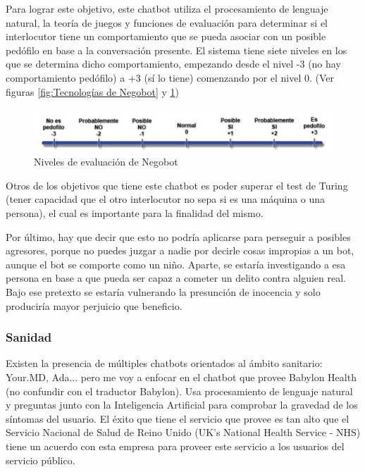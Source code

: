 \documentclass[spanish,12pt, a4paper, twoside]{paper}
\begin{document}
Para lograr este objetivo, este chatbot utiliza el procesamiento de lenguaje natural, la teoría de juegos y funciones de evaluación para determinar si el interlocutor tiene un comportamiento que se pueda asociar con un posible pedófilo en base a la conversación presente. El sistema tiene siete niveles en los que se determina dicho comportamiento, empezando desde el nivel -3 (no hay comportamiento pedófilo) a +3 (sí lo tiene) comenzando por el nivel 0. (Ver figuras \ref{fig:Tecnologías de Negobot} y \ref{fig:Niveles de evaluación de Negobot})
\newline

\begin{figure}
\centering
	\includegraphics[width=\textwidth]{recursos/Negobot_puntuaciones}
\caption{Niveles de evaluación de Negobot}
\label{fig:Niveles de evaluación de Negobot}
\end{figure}

Otros de los objetivos que tiene este chatbot es poder superar el test de Turing (tener capacidad que el otro interlocutor no sepa si es una máquina o una persona), el cual es importante para la finalidad del mismo.
\newline

Por último, hay que decir que esto no podría aplicarse para perseguir a posibles agresores, porque no puedes juzgar a nadie por decirle cosas impropias a un bot, aunque el bot se comporte como un niño. Aparte, se estaría investigando a esa persona en base a que pueda ser capaz a cometer un delito contra alguien real. Bajo ese pretexto se estaría vulnerando la presunción de inocencia y solo produciría mayor perjuicio que beneficio.

\subsubsection{Sanidad}

Existen la presencia de múltiples chatbots orientados al ámbito sanitario: Your.MD, Ada... pero me voy a enfocar en el chatbot que provee Babylon Health (no confundir con el traductor Babylon). Usa procesamiento de lenguaje natural y preguntas junto con la Inteligencia Artificial para comprobar la gravedad de los síntomas del usuario. El éxito que tiene el servicio que provee es tan alto que el Servicio Nacional de Salud de Reino Unido (UK's National Health Service - NHS) tiene un acuerdo con esta empresa para proveer este servicio a los usuarios del servicio público.
\newline
\end{document}

